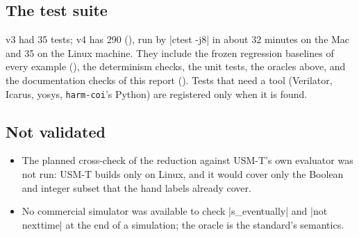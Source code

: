 \subsection{The test suite}
v3 had 35 tests; v4 has 290 (), run by \code|ctest -j8| in about 32 minutes on the Mac and 35 on the Linux machine. They include the frozen regression baselines of every example (), the determinism checks, the unit tests, the oracles above, and the documentation checks of this report (). Tests that need a tool (Verilator, Icarus, yosys, \texttt{harm-coi}'s Python) are registered only when it is found.

\subsection{Not validated}
\begin{itemize}
\item The planned cross-check of the reduction against USM-T's own evaluator was not run: USM-T builds only on Linux, and it would cover only the Boolean and integer subset that the hand labels already cover.
\item No commercial simulator was available to check \code|s_eventually| and \code|not nexttime| at the end of a simulation; the oracle is the standard's semantics.
\end{itemize}
